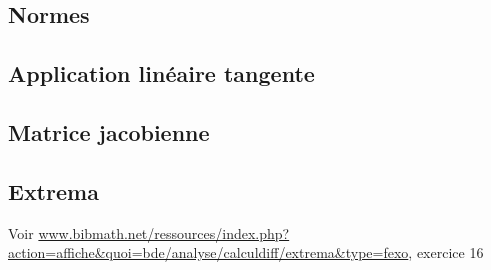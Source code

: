 \newcommand{\multivar}{/home/robin/ENSEIGN/Cours/MathBiologie/L3-ENS-Math1/Exercices/MultiVar}

\subsection{Normes}





\subsection{Application linéaire tangente}





\subsection{Matrice jacobienne}





\subsection{Extrema}







Voir \url{www.bibmath.net/ressources/index.php?action=affiche&quoi=bde/analyse/calculdiff/extrema&type=fexo}, exercice 16
